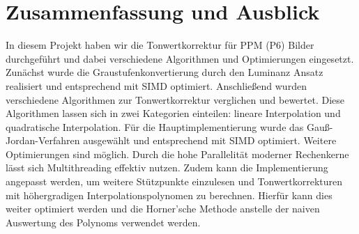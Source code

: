 \documentclass[course=erap]{aspdoc}
\begin{document}
\section{Zusammenfassung und Ausblick}
In diesem Projekt haben wir die Tonwertkorrektur für PPM (P6) Bilder durchgeführt und dabei verschiedene Algorithmen und Optimierungen eingesetzt. Zunächst wurde die Graustufenkonvertierung durch den Luminanz Ansatz realisiert und entsprechend mit SIMD optimiert. Anschließend wurden verschiedene Algorithmen zur Tonwertkorrektur verglichen und bewertet. Diese Algorithmen lassen sich in zwei Kategorien einteilen: lineare Interpolation und quadratische Interpolation. Für die Hauptimplementierung wurde das Gauß-Jordan-Verfahren ausgewählt und entsprechend mit SIMD optimiert. 
Weitere Optimierungen sind möglich. Durch die hohe Parallelität moderner Rechenkerne lässt sich Multithreading effektiv nutzen.
 Zudem kann die Implementierung angepasst werden, um weitere Stützpunkte einzulesen und Tonwertkorrekturen mit höhergradigen Interpolationspolynomen zu berechnen. Hierfür kann dies weiter optimiert werden und die Horner'sche Methode anstelle der naiven Auswertung des Polynoms verwendet werden.	

{}
\end{document}
